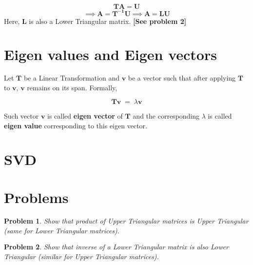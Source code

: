 \documentclass[a4paper]{article}
\newtheorem{problem}{Problem}
\begin{document}
        \begin{equation*}
            \mathbf{TA} = \mathbf{U}
        \end{equation*}
        \begin{equation*}
            \implies \mathbf{A} = \mathbf{T^{-1}U}
            \implies \mathbf{A} = \mathbf{LU}
        \end{equation*}
        Here, $\mathbf{L}$ is also a Lower Triangular matrix. \textbf{[See problem 2]}
        
        
\section{Eigen values and Eigen vectors}
    Let $\mathbf{T}$ be a Linear Transformation and $\mathbf{v}$ be a vector such that after applying $\mathbf{T}$ to $\mathbf{v}$, $\mathbf{v}$ remains on its span. Formally,
    
    \begin{equation*}
        \mathbf{Tv} \; = \; \lambda \mathbf{v}
    \end{equation*}
    
    Such vector $\mathbf{v}$ is called \textbf{eigen vector} of $\mathbf{T}$ and the corresponding $\lambda$ is called \textbf{eigen value} corresponding to this eigen vector.
    
\section{SVD}

\section{Problems}

\begin{problem}
    Show that product of Upper Triangular matrices is Upper Triangular (same for Lower Triangular matrices).
\end{problem}

\begin{problem}
    Show that inverse of a Lower Triangular matrix is also Lower Triangular (similar for Upper Triangular matrices).
\end{problem}
\end{document}
